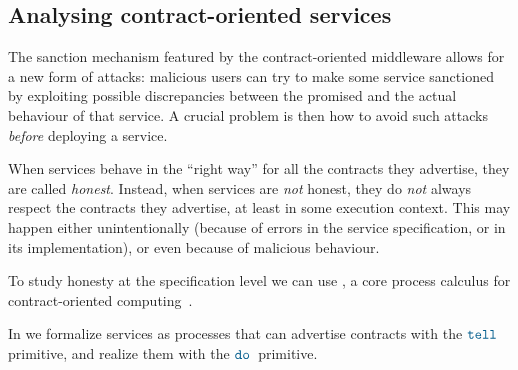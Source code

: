 \subsection*{Analysing contract-oriented services}

The sanction mechanism featured by the contract-oriented middleware
allows for a new form of attacks: 
malicious users can try
to make some service sanctioned by exploiting possible discrepancies between
the promised and the actual behaviour of that service. %
A crucial problem is then
how to avoid such attacks \emph{before} deploying a service. %

When services behave in the ``right way'' for all the contracts
they advertise,
they are called \emph{honest}. %
Instead, when services are \emph{not} honest,
they do \emph{not} always respect the contracts they advertise,
at least in some execution context. %
This may happen either unintentionally
(because of errors in the service specification, or in its implementation),
or even because of malicious behaviour.

To study honesty at the specification level we can use \coco, 
a core process calculus for contract-oriented 
computing~\cite{BZ10lics,BTZ12sacs}.

In \coco we formalize services 
as processes that can advertise contracts with the $\tell{}{}$ primitive,
and realize them with the $\fact{}{}$ primitive. %

